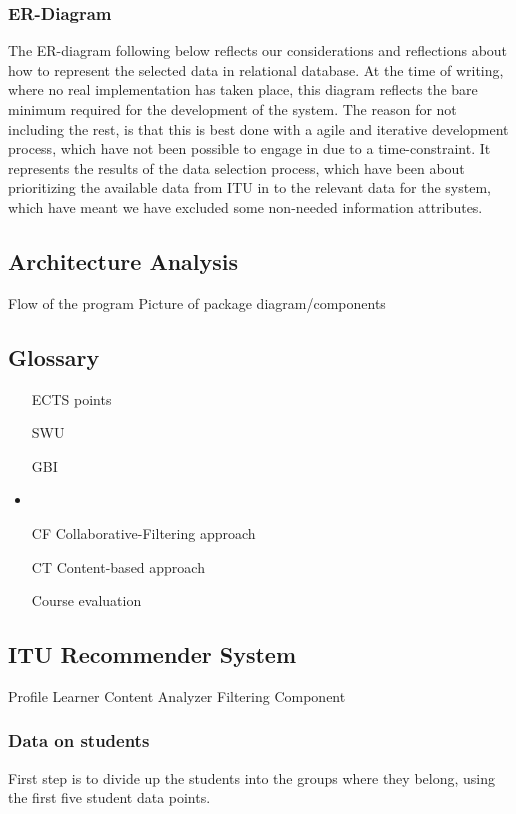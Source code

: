 \subsubsection{ER-Diagram}
The ER-diagram following below reflects our considerations and reflections about how to represent the selected data in relational database. At the time of writing, where no real implementation has taken place, this diagram reflects the bare minimum required for the development of the system. The reason for not including the rest, is that this is best done with a agile and iterative development process, which have not been possible to engage in due to a time-constraint. It represents the results of the data selection process, which have been about prioritizing the available data from ITU in to the relevant data for the system, which have meant we have excluded some non-needed information attributes.


\subsection{Architecture Analysis}
Flow of the program
Picture of package diagram/components

\subsection{Glossary}
\begin{itemize}
	\item[ECTS points] 
	\item[SWU]
	\item[GBI]
	\item {}
	\item[CF] Collaborative-Filtering approach
	\item[CT] Content-based approach
	\item[Course evaluation]
\end{itemize}
\subsection{ITU Recommender System}
Profile Learner
Content Analyzer
Filtering Component


\subsubsection{Data on students}
First step is to divide up the students into the groups where they belong, using the first five student data points.

